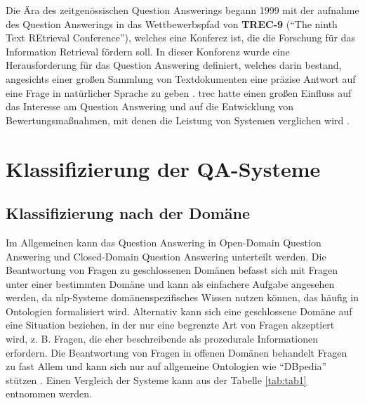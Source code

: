 \documentclass[
        ngerman,
        paper=a4,
        numbers=noendperiod,
]{scrreprt}
\begin{document}
Die Ära des zeitgenössischen Question Answerings begann 1999 mit der aufnahme des Question Answerings in das Wettbewerbspfad von \textbf{TREC-9} (\enquote{The ninth Text REtrieval Conference}), welches eine  Konferez ist, die die Forschung für das Information Retrieval fördern soll. In dieser Konforenz wurde eine Herausforderung für das Question Answering definiert, welches darin bestand, angesichts einer großen Sammlung von Textdokumenten eine präzise Antwort auf eine Frage in natürlicher Sprache zu geben \citep{VoorheesReportTREC-9}. \ac{trec} hatte einen großen Einfluss auf das Interesse am Question Answering und auf die Entwicklung von Bewertungsmaßnahmen, mit denen die Leistung von Systemen verglichen wird \citep{voorhees2005trec}. 


\section{Klassifizierung der QA-Systeme}
\subsection{Klassifizierung nach der Domäne}
Im Allgemeinen kann das Question Answering in Open-Domain Question Answering und Closed-Domain Question Answering unterteilt werden. Die Beantwortung von Fragen zu geschlossenen Domänen befasst sich mit Fragen unter einer bestimmten Domäne und kann als einfachere Aufgabe angesehen werden, da \ac{nlp}-Systeme domänenspezifisches Wissen nutzen können, das häufig in Ontologien formalisiert wird. Alternativ kann sich eine geschlossene Domäne auf eine Situation beziehen, in der nur eine begrenzte Art von Fragen akzeptiert wird, z. B. Fragen, die eher beschreibende als prozedurale Informationen erfordern. Die Beantwortung von Fragen in offenen Domänen behandelt Fragen zu fast Allem und kann sich nur auf allgemeine Ontologien wie \enquote{DBpedia} stützen \citep{Mervin2013AnSystem}. Einen Vergleich der Systeme kann aus der Tabelle \ref{tab:tab1} entnommen werden.
\end{document}
